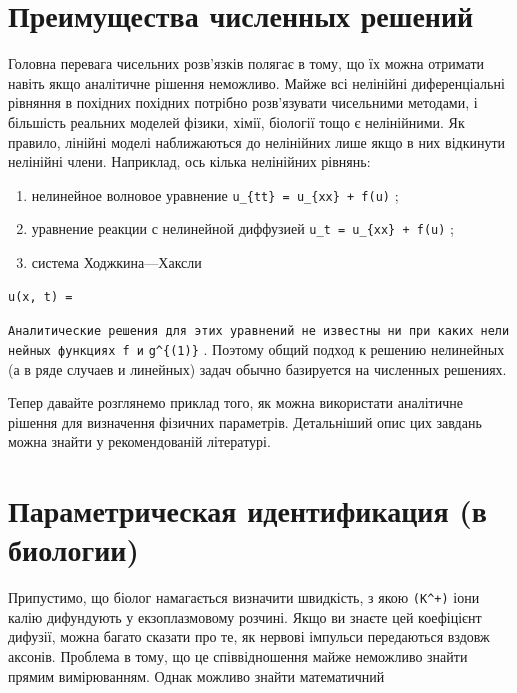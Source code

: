 \documentclass[
  ukrainian,
]{article}
\begin{document}
\section{Преимущества численных
решений}\label{ux43fux440ux435ux438ux43cux443ux449ux435ux441ux442ux432ux430-ux447ux438ux441ux43bux435ux43dux43dux44bux445-ux440ux435ux448ux435ux43dux438ux439}

Головна перевага чисельних розв'язків полягає в тому, що їх можна
отримати навіть якщо аналітичне рішення неможливо. Майже всі нелінійні
диференціальні рівняння в похідних похідних потрібно розв'язувати
чисельними методами, і більшість реальних моделей фізики, хімії,
біології тощо є нелінійними. Як правило, лінійні моделі наближаються до
нелінійних лише якщо в них відкинути нелінійні члени. Наприклад, ось
кілька нелінійних рівнянь:

\begin{enumerate}
\def\labelenumi{\arabic{enumi})}
\item
  нелинейное волновое уравнение
  \texttt{u\_\{tt\}\ =\ u\_\{xx\}\ +\ f(u)} ;
\item
  уравнение реакции с нелинейной диффузией
  \texttt{u\_t\ =\ u\_\{xx\}\ +\ f(u)} ;
\item
  система Ходжкина---Хаксли
\end{enumerate}

\begin{verbatim}
u(x, t) =
\end{verbatim}

\texttt{Аналитические\ решения\ для\ этих\ уравнений\ не\ известны\ ни\ при\ каких\ нелинейных\ функциях\ f\ и}
\texttt{g\^{}\{(1)\}} . Поэтому общий подход к решению нелинейных (а в
ряде случаев и линейных) задач обычно базируется на численных решениях.

Тепер давайте розглянемо приклад того, як можна використати аналітичне
рішення для визначення фізичних параметрів. Детальніший опис цих завдань
можна знайти у рекомендованій літературі.

\section{Параметрическая идентификация (в
биологии)}\label{ux43fux430ux440ux430ux43cux435ux442ux440ux438ux447ux435ux441ux43aux430ux44f-ux438ux434ux435ux43dux442ux438ux444ux438ux43aux430ux446ux438ux44f-ux432-ux431ux438ux43eux43bux43eux433ux438ux438}

Припустимо, що біолог намагається визначити швидкість, з якою
\texttt{(K\^{}+)} іони калію дифундують у екзоплазмовому розчині. Якщо
ви знаєте цей коефіцієнт дифузії, можна багато сказати про те, як
нервові імпульси передаються вздовж аксонів. Проблема в тому, що це
співвідношення майже неможливо знайти прямим вимірюванням. Однак можливо
знайти математичний
\end{document}
